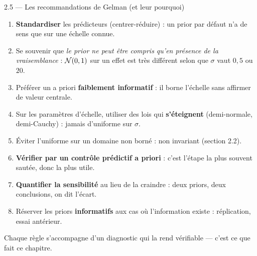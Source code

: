 \begin{frame}{2.5 — Les recommandations de Gelman (et leur pourquoi)}
\small
\begin{kbox}
\begin{enumerate}
  \item \textbf{Standardiser} les prédicteurs (centrer-réduire) : un prior par
        défaut n'a de sens que sur une échelle connue.
  \item Se souvenir que \emph{le prior ne peut être compris qu'en présence de la
        vraisemblance} : $\mathcal{N}(0,1)$ sur un effet est très différent selon que
        $\sigma$ vaut $0{,}5$ ou $20$.
  \item Préférer un a priori \textbf{faiblement informatif} : il borne l'échelle
        sans affirmer de valeur centrale.
  \item Sur les paramètres d'échelle, utiliser des lois qui \textbf{s'éteignent}
        (demi-normale, demi-Cauchy) : jamais d'uniforme sur $\sigma$.
  \item Éviter l'uniforme sur un domaine non borné : non invariant (section 2.2).
  \item \textbf{Vérifier par un contrôle prédictif a priori} : c'est l'étape la
        plus souvent sautée, donc la plus utile.
  \item \textbf{Quantifier la sensibilité} au lieu de la craindre : deux priors,
        deux conclusions, on dit l'écart.
  \item Réserver les priors \textbf{informatifs} aux cas où l'information existe :
        réplication, essai antérieur.
\end{enumerate}
\end{kbox}
\vspace{1mm}
\centering\small
Chaque règle s'accompagne d'un diagnostic qui la rend vérifiable — c'est ce que
fait ce chapitre.
\end{frame}

